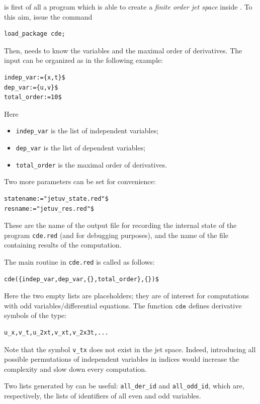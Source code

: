 \cde is first of all a program which is able to create a \emph{finite order jet
  space} inside \REDUCE. To this aim, issue the command
\begin{verbatim}
load_package cde;
\end{verbatim}
Then, \cde needs to know the variables and the maximal
order of derivatives. The input can be organized as in the following example:
\hypertarget{variable:INDEP_VAR}{}
\hypertarget{variable:DEP_VAR}{}
\hypertarget{variable:TOTAL_ORDER}{}
\begin{verbatim}
indep_var:={x,t}$
dep_var:={u,v}$
total_order:=10$
\end{verbatim}
Here
\begin{itemize}
\item \texttt{indep\_var} is the list of independent variables;
\item \texttt{dep\_var} is the list of dependent variables;
\item \texttt{total\_order} is the maximal order of derivatives.
\end{itemize}

Two more parameters can be set for convenience:
\begin{verbatim}
statename:="jetuv_state.red"$
resname:="jetuv_res.red"$
\end{verbatim}
These are the name of the output file for recording the internal state of the
program \texttt{cde.red} (and for debugging purposes), and the name of the file
containing results of the computation.

The main routine in \texttt{cde.red} is called as follows:
\hypertarget{operator:CDE}{}
\begin{verbatim}
cde({indep_var,dep_var,{},total_order},{})$
\end{verbatim}
Here the two empty lists are placeholders; they are of interest for
computations with odd variables/differential equations.
The function $\texttt{cde}$ defines derivative symbols of the type:
\begin{verbatim}
u_x,v_t,u_2xt,v_xt,v_2x3t,...
\end{verbatim}
Note that the symbol \texttt{v\_tx} does not exist in the jet space. Indeed,
introducing all possible permutations of independent variables in indices would
increase the complexity and slow down every computation.

Two lists generated by \cde can be useful: \texttt{all\_der\_id} and
\texttt{all\_odd\_id}, which are, respectively, the lists of identifiers of all
even and odd variables.

